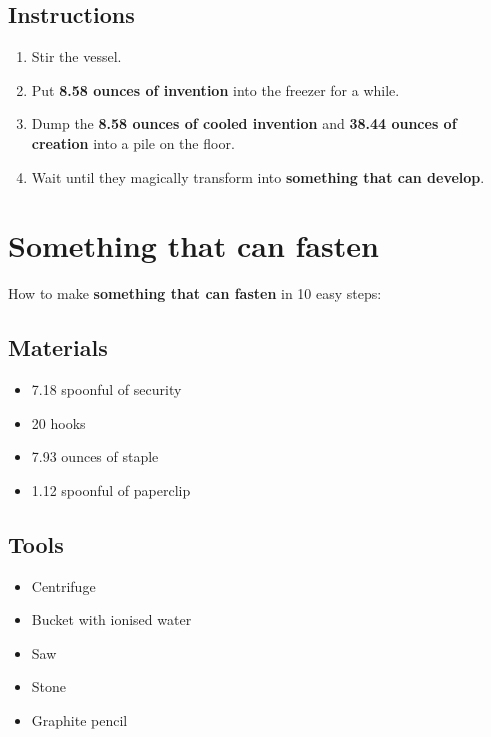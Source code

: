 \documentclass{article}
\begin{document}
\subsection{Instructions}\begin{enumerate}
\item 
Stir the vessel.
\item 
Put \textbf{8.58 ounces of invention} into the freezer for a while.
\item 
Dump the \textbf{8.58 ounces of cooled invention} and \textbf{38.44 ounces of creation} into a pile on the floor.
\item 
Wait until they magically transform into \textbf{something that can develop}.
\end{enumerate}
\newpage
\section{Something that can fasten}How to make \textbf{something that can fasten} in 10 easy steps:

\subsection{Materials}\begin{itemize}
\item 
7.18 spoonful of security
\item 
20 hooks
\item 
7.93 ounces of staple
\item 
1.12 spoonful of paperclip
\end{itemize}
\subsection{Tools}\begin{itemize}
\item 
Centrifuge
\item 
Bucket with ionised water
\item 
Saw
\item 
Stone
\item 
Graphite pencil
\end{itemize}
\end{document}
